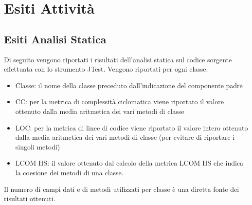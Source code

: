 \chapter{Esiti Attività} %

\label{Capitolo6} %




\section{Esiti Analisi Statica}

Di seguito vengono riportati i risultati dell'analisi statica sul codice sorgente effettuata
con lo strumento JTest. Vengono riportati per ogni
classe:
\begin{itemize}


\item Classe: il nome della classe preceduto dall'indicazione del componente padre
\item CC: per la metrica di complessità ciclomatica viene riportato il valore ottenuto
dalla media aritmetica dei vari metodi di classe 
\item LOC: per la metrica di linee di codice viene riportato il valore intero ottenuto dalla
media aritmetica dei vari metodi di classe (per evitare di riportare i singoli
metodi)
\item LCOM HS:
il valore ottenuto dal calcolo della metrica LCOM HS che indica la
coesione dei metodi di una classe.

\end{itemize}

Il numero di campi dati e di metodi utilizzati per classe è una diretta fonte dei risultati ottenuti.


